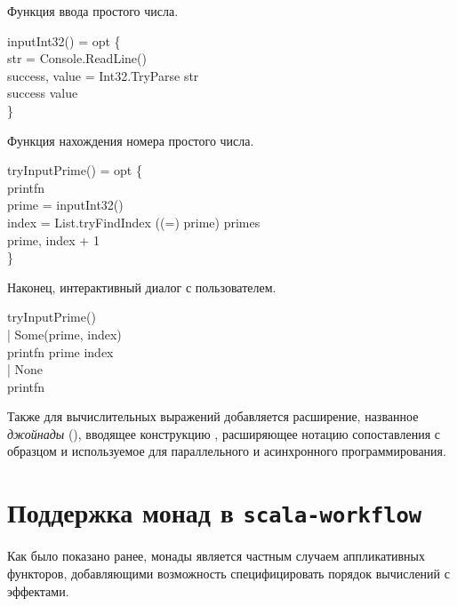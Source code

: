 Функция ввода простого числа.

\begin{haskell}
 inputInt32() = opt \{ \\
\quad\quad {} str = Console.ReadLine() \\
\quad\quad {} success, value = Int32.TryParse str \\
\quad\quad {} success   value \\
\} \\
\end{haskell}

Функция нахождения номера простого числа.

\begin{haskell}
 tryInputPrime() = opt \{ \\
\quad\quad printfn  \\
\quad\quad {} prime = inputInt32() \\
\quad\quad {} index = List.tryFindIndex ((=) prime) primes \\
\quad\quad {} prime, index + 1 \\
\} \\
\end{haskell}

Наконец, интерактивный диалог с пользователем.

\begin{haskell}
 tryInputPrime()  \\
\quad\quad | Some(prime, index) \to \\
\quad\quad\quad\quad printfn  prime index \\
\quad\quad | None \to \\
\quad\quad\quad\quad printfn  \\
\end{haskell}

Также для вычислительных выражений добавляется расширение, названное \emph{джойнады}\cite{Petricek2011} (), вводящее конструкцию \<\>, расширяющее нотацию сопоставления с образцом и используемое для параллельного и асинхронного программирования.

\section{Поддержка монад в \texttt{scala-workflow}}
Как было показано ранее, монады является частным случаем аппликативных функторов, добавляющими возможность специфицировать порядок вычислений с эффектами.

